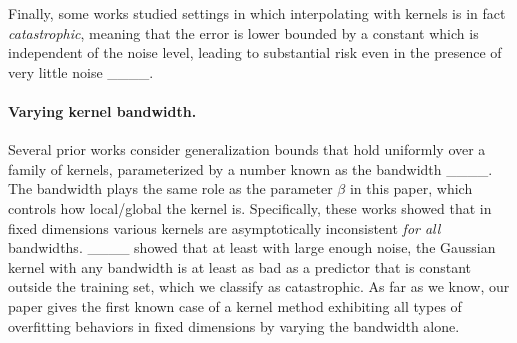 Finally, some works studied settings in which interpolating with kernels is in fact \emph{catastrophic},
meaning that the error is lower bounded by a constant which is independent of the noise level, leading to substantial risk even in the presence of very little noise ____.

\paragraph{Varying kernel bandwidth.}
Several prior works consider generalization bounds that hold uniformly over a family of kernels, parameterized by a number known as the bandwidth ____. The bandwidth plays the same role as the parameter $\beta$ in this paper, which controls how local/global the kernel is. Specifically, these works showed that in fixed dimensions various kernels are asymptotically inconsistent \emph{for all} bandwidths. ____ showed that at least with large enough noise, the Gaussian kernel with any bandwidth is at least as bad as a predictor that is constant outside the training set, which we classify as catastrophic. As far as we know, our paper gives the first known case of a kernel method exhibiting all types of overfitting behaviors in fixed dimensions by varying the bandwidth alone.
